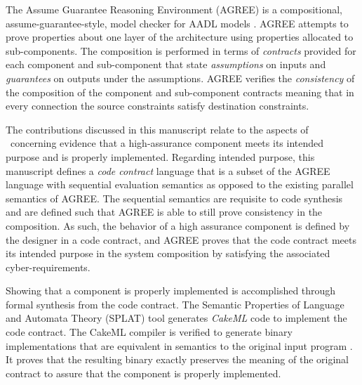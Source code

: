 The Assume Guarantee Reasoning Environment (AGREE) is a compositional, assume-guarantee-style, model checker for AADL models \cite{compositional-analysis-agree,nfm:agree}. 
AGREE attempts to prove properties about one layer of the architecture using properties allocated to sub-components.
The composition is performed in terms of \emph{contracts} provided for each component and sub-component that state \emph{assumptions} on inputs and \emph{guarantees} on outputs under the assumptions.
AGREE verifies the \emph{consistency} of the composition of the component and sub-component contracts meaning that in every connection the source constraints satisfy destination constraints.

The contributions discussed in this manuscript relate to the aspects of \brfcs\ concerning evidence that a high-assurance component meets its intended purpose and is properly implemented.
Regarding intended purpose, this manuscript defines a \emph{code contract} language that is a subset of the AGREE language with sequential evaluation semantics as opposed to the existing parallel semantics of AGREE.
The sequential semantics are requisite to code synthesis and are defined such that AGREE is able to still prove consistency in the composition. 
As such, the behavior of a high assurance component is defined by the designer in a code contract, and AGREE proves that the code contract meets its intended purpose in the system composition by satisfying the associated cyber-requirements.

Showing that a component is properly implemented is accomplished through formal synthesis from the code contract.
The Semantic Properties of Language and Automata Theory (SPLAT) tool generates \emph{CakeML} code to implement the code contract.
The CakeML compiler is verified to generate binary implementations that are equivalent in semantics to the original input program \cite{cakeml}.
It proves that the resulting binary exactly preserves the meaning of the original contract to assure that the component is properly implemented.